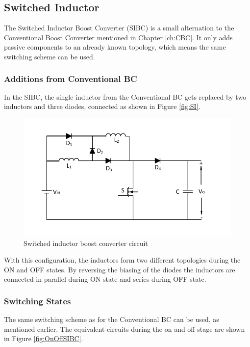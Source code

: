 
\subsection{Switched Inductor}\label{ch:SIBC}
The Switched Inductor Boost Converter (SIBC) is a small alternation to the Conventional Boost Converter mentioned in Chapter \ref{ch:CBC}.
It only adds passive components to an already known topology,
which means the same switching scheme can be used.
\subsubsection{Additions from Conventional BC}
In the SIBC,
the single inductor from the Conventional BC gets replaced by two inductors and three diodes,
connected as shown in Figure \ref{fig:SI}.

\begin{figure}[H]
   \centering
   \includegraphics[width=\textwidth]{figures/bSwitchedInductor/switched_inductor.pdf}
    \caption{Switched inductor boost converter circuit}
	\label{fig:SwitchedInductor}
\end{figure}


With this configuration,
the inductors form two different topologies during the ON and OFF states. By reversing the biasing of the diodes the inductors are connected in parallel during ON state and series during OFF state.   


\subsubsection{Switching States}
The same switching scheme as for the Conventional BC can be used,
as mentioned earlier.
The equivalent circuits during the on and off stage are shown in Figure \ref{fig:OnOffSIBC}.

